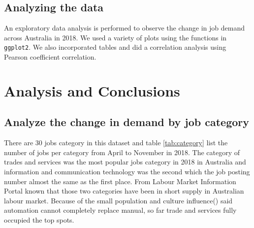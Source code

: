 \documentclass[11pt,a4paper,]{article}
\begin{document}
\hypertarget{analyzing-the-data}{%
\subsection{Analyzing the data}\label{analyzing-the-data}}

An exploratory data analysis is performed to observe the change in job demand across Australia in 2018. We used a variety of plots using the functions in \texttt{ggplot2}. We also incorporated tables and did a correlation analysis using Pearson coefficient correlation.

\hypertarget{analysis-and-conclusions}{%
\section{Analysis and Conclusions}\label{analysis-and-conclusions}}

\hypertarget{analyze-the-change-in-demand-by-job-category}{%
\subsection{Analyze the change in demand by job category}\label{analyze-the-change-in-demand-by-job-category}}

There are 30 jobs category in this dataset and table \ref{tab:category} list the number of jobs per category from April to November in 2018. The category of trades and services was the most popular jobs category in 2018 in Australia and information and communication technology was the second which the job posting number almost the same as the first place. From Labour Market Information Portal \autocite{welcome} known that those two categories have been in short supply in Australian labour market. Because of the small population and culture influence(\textcite{burgess_2018}) said automation cannot completely replace manual, so far trade and services fully occupied the top spots.
\end{document}
